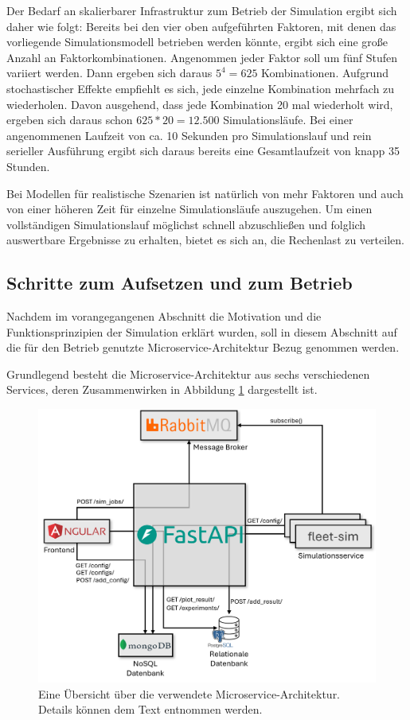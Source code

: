 \documentclass[11pt,a4paper]{article}
\begin{document}
Der Bedarf an skalierbarer Infrastruktur zum Betrieb der Simulation ergibt sich daher wie folgt:
Bereits bei den vier oben aufgeführten Faktoren, mit denen das vorliegende Simulationsmodell betrieben werden könnte,
ergibt sich eine große Anzahl an Faktorkombinationen.
Angenommen jeder Faktor soll um fünf Stufen variiert werden. Dann ergeben sich daraus
$5^4 = 625$ Kombinationen. Aufgrund stochastischer Effekte empfiehlt es sich, jede einzelne
Kombination mehrfach zu wiederholen. Davon ausgehend, dass jede Kombination 20 mal wiederholt wird,
ergeben sich daraus schon $625 * 20 = 12.500$ Simulationsläufe. Bei einer angenommenen Laufzeit von ca. 10 Sekunden
pro Simulationslauf und rein serieller Ausführung ergibt sich daraus bereits eine Gesamtlaufzeit von
knapp 35 Stunden.

Bei Modellen für realistische Szenarien ist natürlich von mehr Faktoren und auch von einer höheren Zeit 
für einzelne Simulationsläufe auszugehen. Um einen vollständigen Simulationslauf möglichst schnell abzuschließen
und folglich auswertbare Ergebnisse zu erhalten, bietet es sich an, die Rechenlast zu verteilen.  

\subsection{Schritte zum Aufsetzen und zum Betrieb}
Nachdem im vorangegangenen Abschnitt die Motivation und die Funktionsprinzipien der Simulation erklärt wurden,
soll in diesem Abschnitt auf die für den Betrieb genutzte Microservice-Architektur Bezug genommen werden.

Grundlegend besteht die Microservice-Architektur aus sechs verschiedenen Services, deren Zusammenwirken
in Abbildung \ref{fig:microservice-architektur} dargestellt ist.

\begin{figure}
	\label{fig:microservice-architektur}
	\centering
	\includegraphics[width=\textwidth]{media/Microservice-Architektur.png}
	\caption{
		Eine Übersicht über die verwendete Microservice-Architektur.
		Details können dem Text entnommen werden.
	}
\end{figure}
\end{document}
